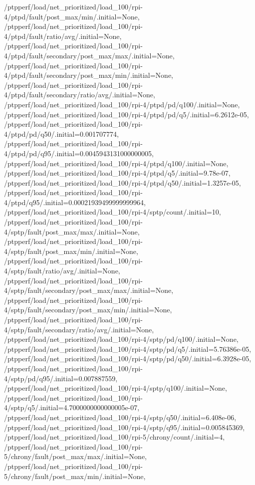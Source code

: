 {    /ptpperf/load/net_prioritized/load_100/rpi-4/ptpd/fault/post_max/min/.initial=None,
    /ptpperf/load/net_prioritized/load_100/rpi-4/ptpd/fault/ratio/avg/.initial=None,
    /ptpperf/load/net_prioritized/load_100/rpi-4/ptpd/fault/secondary/post_max/max/.initial=None,
    /ptpperf/load/net_prioritized/load_100/rpi-4/ptpd/fault/secondary/post_max/min/.initial=None,
    /ptpperf/load/net_prioritized/load_100/rpi-4/ptpd/fault/secondary/ratio/avg/.initial=None,
    /ptpperf/load/net_prioritized/load_100/rpi-4/ptpd/pd/q100/.initial=None,
    /ptpperf/load/net_prioritized/load_100/rpi-4/ptpd/pd/q5/.initial=6.2612e-05,
    /ptpperf/load/net_prioritized/load_100/rpi-4/ptpd/pd/q50/.initial=0.001707774,
    /ptpperf/load/net_prioritized/load_100/rpi-4/ptpd/pd/q95/.initial=0.0045943131000000005,
    /ptpperf/load/net_prioritized/load_100/rpi-4/ptpd/q100/.initial=None,
    /ptpperf/load/net_prioritized/load_100/rpi-4/ptpd/q5/.initial=9.78e-07,
    /ptpperf/load/net_prioritized/load_100/rpi-4/ptpd/q50/.initial=1.3257e-05,
    /ptpperf/load/net_prioritized/load_100/rpi-4/ptpd/q95/.initial=0.00021939499999999964,
    /ptpperf/load/net_prioritized/load_100/rpi-4/sptp/count/.initial=10,
    /ptpperf/load/net_prioritized/load_100/rpi-4/sptp/fault/post_max/max/.initial=None,
    /ptpperf/load/net_prioritized/load_100/rpi-4/sptp/fault/post_max/min/.initial=None,
    /ptpperf/load/net_prioritized/load_100/rpi-4/sptp/fault/ratio/avg/.initial=None,
    /ptpperf/load/net_prioritized/load_100/rpi-4/sptp/fault/secondary/post_max/max/.initial=None,
    /ptpperf/load/net_prioritized/load_100/rpi-4/sptp/fault/secondary/post_max/min/.initial=None,
    /ptpperf/load/net_prioritized/load_100/rpi-4/sptp/fault/secondary/ratio/avg/.initial=None,
    /ptpperf/load/net_prioritized/load_100/rpi-4/sptp/pd/q100/.initial=None,
    /ptpperf/load/net_prioritized/load_100/rpi-4/sptp/pd/q5/.initial=5.76386e-05,
    /ptpperf/load/net_prioritized/load_100/rpi-4/sptp/pd/q50/.initial=6.3928e-05,
    /ptpperf/load/net_prioritized/load_100/rpi-4/sptp/pd/q95/.initial=0.007887559,
    /ptpperf/load/net_prioritized/load_100/rpi-4/sptp/q100/.initial=None,
    /ptpperf/load/net_prioritized/load_100/rpi-4/sptp/q5/.initial=4.7000000000000005e-07,
    /ptpperf/load/net_prioritized/load_100/rpi-4/sptp/q50/.initial=6.408e-06,
    /ptpperf/load/net_prioritized/load_100/rpi-4/sptp/q95/.initial=0.005845369,
    /ptpperf/load/net_prioritized/load_100/rpi-5/chrony/count/.initial=4,
    /ptpperf/load/net_prioritized/load_100/rpi-5/chrony/fault/post_max/max/.initial=None,
    /ptpperf/load/net_prioritized/load_100/rpi-5/chrony/fault/post_max/min/.initial=None,
}
